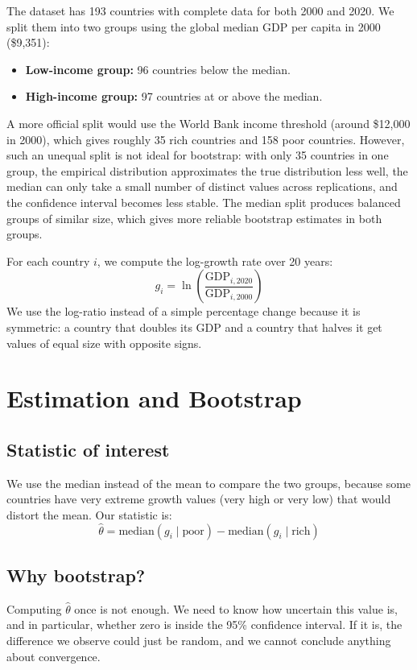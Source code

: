 \documentclass[10pt, twocolumn, a4paper]{article}
\begin{document}
The dataset has 193 countries with complete data for both 2000 and 2020. We split them into
two groups using the global median GDP per capita in 2000 (\$9{,}351):
\begin{itemize}
    \item \textbf{Low-income group:} 96 countries below the median.
    \item \textbf{High-income group:} 97 countries at or above the median.
\end{itemize}
A more official split would use the World Bank income threshold (around \$12{,}000 in 2000),
which gives roughly 35 rich countries and 158 poor countries. However, such an unequal split
is not ideal for bootstrap: with only 35 countries in one group, the empirical distribution
approximates the true distribution less well, the median can only take a small number of
distinct values across replications, and the confidence interval becomes less stable. The
median split produces balanced groups of similar size, which gives more reliable bootstrap
estimates in both groups.

For each country $i$, we compute the log-growth rate over 20 years:
\begin{equation}
    g_i = \ln\!\left(\frac{\text{GDP}_{i,2020}}{\text{GDP}_{i,2000}}\right)
\end{equation}
We use the log-ratio instead of a simple percentage change because it is symmetric: a country
that doubles its GDP and a country that halves it get values of equal size with opposite signs.

\section{Estimation and Bootstrap}

\subsection*{Statistic of interest}
We use the median instead of the mean to compare the two groups, because some countries have
very extreme growth values (very high or very low) that would distort the mean. Our statistic is:
\begin{equation}
    \hat{\theta} = \text{median}(g_i \mid \text{poor}) - \text{median}(g_i \mid \text{rich})
\end{equation}

\subsection*{Why bootstrap?}
Computing $\hat{\theta}$ once is not enough. We need to know how uncertain this value is,
and in particular, whether zero is inside the 95\% confidence interval. If it is, the
difference we observe could just be random, and we cannot conclude anything about convergence.
\end{document}
